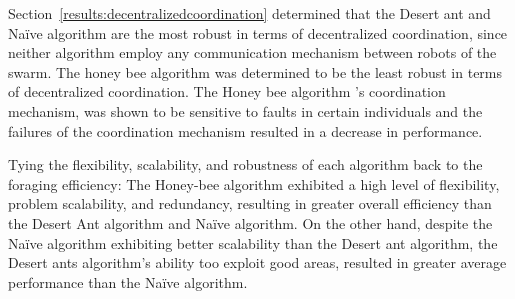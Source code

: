 Section~\ref{results:decentralizedcoordination} determined that the Desert ant and Na\"ive algorithm are the most robust in terms of decentralized coordination, since neither algorithm employ any communication mechanism between robots of the swarm. The honey bee algorithm was determined to be the least robust in terms of decentralized coordination. The Honey bee algorithm 's coordination mechanism, was shown to be sensitive to faults in certain individuals and the failures of the coordination mechanism resulted in a decrease in performance.

Tying the flexibility, scalability, and robustness of each algorithm back to the foraging efficiency: The Honey-bee algorithm exhibited a high level of flexibility, problem scalability, and redundancy, resulting in greater overall efficiency than the Desert Ant algorithm and Na\"ive algorithm. On the other hand, despite the Na\"ive algorithm exhibiting better scalability than the Desert ant algorithm, the Desert ants algorithm's ability too exploit good areas, resulted in greater average performance than the Na\"ive algorithm.

